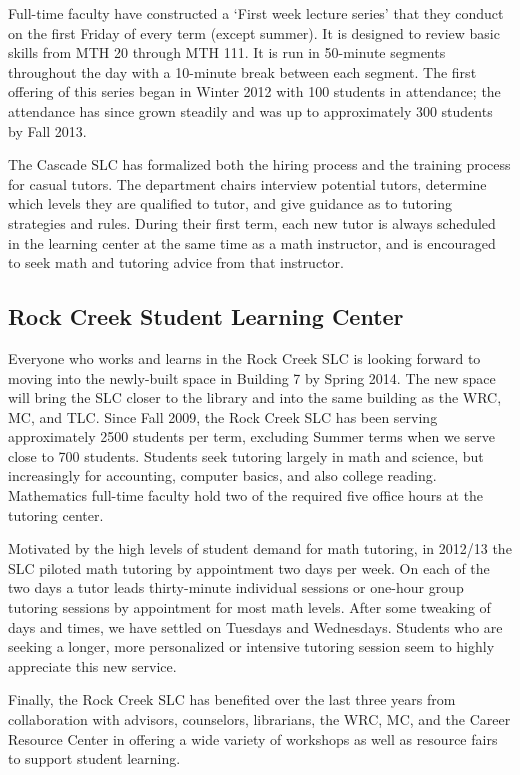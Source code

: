 Full-time faculty have constructed a `First week lecture series' that they
conduct on the first Friday of every term (except summer). It is designed to
review basic skills from MTH 20 through MTH 111. It is run in 50-minute
segments throughout the day with a 10-minute break between each segment. The
first offering of this series began in Winter 2012 with 100 students in
attendance; the attendance has since  grown steadily and  was up to
approximately 300 students by Fall 2013. 

The Cascade SLC has formalized both the hiring process and the training process
for casual tutors. The department chairs interview potential tutors, determine 
which levels they are qualified to tutor, and give guidance as to tutoring 
strategies and rules. During their first term, each new tutor is always scheduled in the learning center at the same time as a math instructor, and is encouraged to seek math 
and tutoring advice from that instructor.

\subsection{Rock Creek Student Learning Center}
Everyone who works and learns in the Rock Creek SLC is looking forward to
moving into the newly-built space in Building 7 by Spring 2014. The new space
will bring the SLC closer to the library and into the same building as the WRC,
MC, and TLC.  Since Fall 2009, the Rock Creek SLC has been serving
approximately 2500 students per term, excluding Summer terms when we serve close
to 700 students.  Students seek tutoring largely in math and science, but
increasingly for accounting, computer basics, and also college reading.
Mathematics full-time faculty hold two of the required five office hours at the
tutoring center.

Motivated by the high levels of student demand for math tutoring, in 2012/13
the SLC piloted math tutoring by appointment two days per week. On each of the
two days a tutor leads thirty-minute individual sessions or one-hour group
tutoring sessions by appointment for most math levels.  After some tweaking of
days and times, we have settled on Tuesdays and Wednesdays.  Students who are
seeking a longer, more personalized or intensive tutoring session seem to
highly appreciate this new service.  

Finally, the Rock Creek SLC has benefited over the last three years from collaboration
with advisors, counselors, librarians, the WRC, MC, and the Career Resource
Center in offering a wide variety of workshops as well as resource fairs to
support student learning. 

